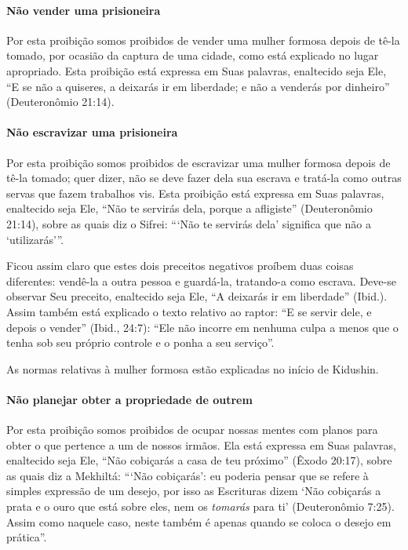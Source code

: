 \paragraph{Não vender uma prisioneira}

Por esta proibição somos proibidos de vender uma mulher formosa depois
de tê-la tomado, por ocasião da captura de uma cidade, como está
explicado no lugar apropriado. Esta proibição está expressa em Suas
palavras, enaltecido seja Ele, ``E se não a quiseres, a deixarás ir em
liberdade; e não a venderás por dinheiro'' (Deuteronômio 21:14).

\paragraph{Não escravizar uma prisioneira}

Por esta proibição somos proibidos de escravizar uma mulher formosa
depois de tê-la tomado; quer dizer, não se deve fazer dela sua escrava e
tratá-la como outras servas que fazem trabalhos vis. Esta proibição está
expressa em Suas palavras, enaltecido seja Ele, ``Não te servirás dela,
porque a afligiste'' (Deuteronômio 21:14), sobre as quais diz o Sifrei:
```Não te servirás dela' significa que não a `utilizarás'''.

Ficou assim claro que estes dois preceitos negativos proíbem duas coisas
diferentes: vendê-la a outra pessoa e guardá-la, tratando-a como
escrava. Deve-se observar Seu preceito, enaltecido seja Ele, ``A
deixarás ir em liberdade'' (Ibid.). Assim também está explicado o texto
relativo ao raptor: ``E se servir dele, e depois o vender'' (Ibid.,
24:7): ``Ele não incorre em nenhuma culpa a menos que o tenha sob seu
próprio controle e o ponha a seu serviço''.

As normas relativas à mulher formosa estão explicadas no início de Kidushin.

\paragraph{Não planejar obter a propriedade de outrem}

Por esta proibição somos proibidos de ocupar nossas mentes com planos
para obter o que pertence a um de nossos irmãos. Ela está expressa em
Suas palavras, enaltecido seja Ele, ``Não cobiçarás a casa de teu
próximo'' (Êxodo 20:17), sobre as quais diz a Mekhiltá: ```Não
cobiçarás': eu poderia pensar que se refere à simples expressão de um
desejo, por isso as Escrituras dizem `Não cobiçarás a prata e o ouro que
está sobre eles, nem os \emph{tomarás} para ti' (Deuteronômio 7:25).
Assim como naquele caso, neste também é apenas quando se coloca o
desejo em prática''.

